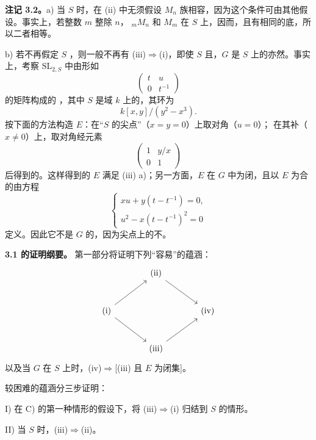 \textbf{注记 3.2。}a) 当 $S$ 时，在 (ii) 中无须假设 $M_n$ 族相容，因为这个条件可由其他假设。事实上，若整数 $m$ 整除 $n$， ${}_mM_n$ 和 $M_m$ 在 $S$ 上，因而，且有相同的底，所以二者相等。

b) 若不再假定 $S$ ，则一般不再有 (iii)$\Rightarrow$(i)，即使 $S$ 且，$G$ 是 $S$ 上的亦然。事实上，考察 $\mathrm{SL}_{2,S}$ 中由形如
\[\begin{pmatrix}t&u\\0&t^{-1}\end{pmatrix}\]
的矩阵构成的 ，其中 $S$ 是域 $k$ 上的，其环为
\[k[x,y]/(y^2-x^3).\]
按下面的方法构造 $E$：在“$S$ 的尖点”（$x=y=0$）上取对角（$u=0$）；
在其补（$x\ne0$）上，取对角经元素
\[\begin{pmatrix}1&y/x\\0&1\end{pmatrix}\]
后得到的。这样得到的 $E$ 满足 (iii) a)；另一方面，$E$ 在 $G$ 中为闭，且以 $E$ 为合的由方程
\[\begin{cases}xu+y(t-t^{-1})=0,\\u^2-x(t-t^{-1})^2=0\end{cases}\]
定义。因此它不是 $G$ 的，因为尖点上的不。

\textbf{3.1 的证明纲要。}
第一部分将证明下列“容易”的蕴涵：
\[
\begin{tikzcd}[row sep=large,column sep=large]
&\mathrm{(ii)}\arrow[dr]&\\
\mathrm{(i)}\arrow[ur]\arrow[dr]&&\mathrm{(iv)}\\
&\mathrm{(iii)}\arrow[ur]&
\end{tikzcd}
\]
以及当 $G$ 在 $S$ 上时，(iv)$\Rightarrow$[(iii) 且 $E$ 为闭集]。

较困难的蕴涵分三步证明：

I) 在 C) 的第一种情形的假设下，将 (iii)$\Rightarrow$(i) 归结到 $S$ 的情形。

II) 当 $S$ 时，(iii)$\Rightarrow$(ii)。

